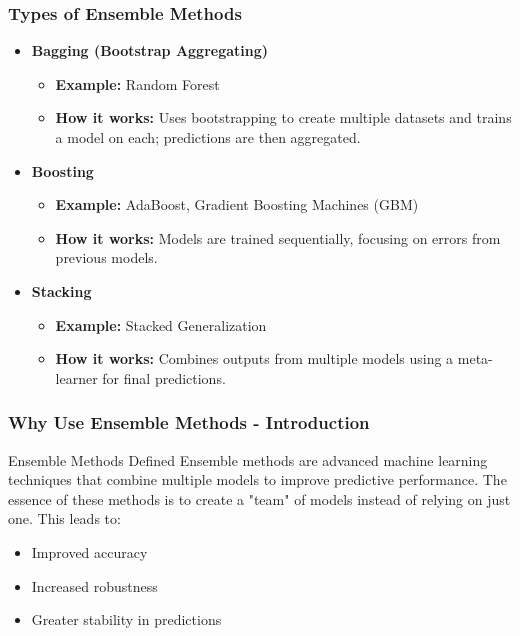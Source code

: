 \documentclass[aspectratio=169]{beamer}
\begin{document}
\begin{frame}[fragile]
    \frametitle{Types of Ensemble Methods}
    \begin{itemize}
        \item \textbf{Bagging (Bootstrap Aggregating)}
            \begin{itemize}
                \item \textbf{Example:} Random Forest
                \item \textbf{How it works:} Uses bootstrapping to create multiple datasets and trains a model on each; predictions are then aggregated.
            \end{itemize}
        \item \textbf{Boosting}
            \begin{itemize}
                \item \textbf{Example:} AdaBoost, Gradient Boosting Machines (GBM)
                \item \textbf{How it works:} Models are trained sequentially, focusing on errors from previous models.
            \end{itemize}
        \item \textbf{Stacking}
            \begin{itemize}
                \item \textbf{Example:} Stacked Generalization
                \item \textbf{How it works:} Combines outputs from multiple models using a meta-learner for final predictions.
            \end{itemize}
    \end{itemize}
\end{frame}

\begin{frame}[fragile]
    \frametitle{Why Use Ensemble Methods - Introduction}
    \begin{block}{Ensemble Methods Defined}
        Ensemble methods are advanced machine learning techniques that combine multiple models to improve predictive performance. The essence of these methods is to create a "team" of models instead of relying on just one. This leads to:
    \end{block}
    \begin{itemize}
        \item Improved accuracy
        \item Increased robustness
        \item Greater stability in predictions
    \end{itemize}
\end{frame}
\end{document}
